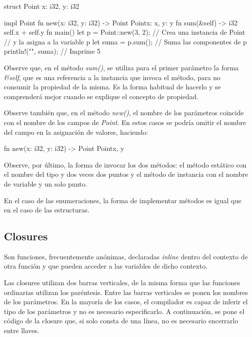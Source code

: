 \vspace{0.7em}
\begin{Codigo}
struct Point {
   x: i32,
   y: i32
}

impl Point {
   fn new(x: i32, y: i32) -> Point {
      Point{x: x, y: y}
   }
   fn sum(&self) -> i32 {
      self.x + self.y
   }
}
fn main() {
   let p = Point::new(3, 2); // Crea una instancia de Point 
                             // y la asigna a la variable p
   let suma = p.sum();       // Suma las componentes de p
   println!("{}", suma);     // Imprime 5
}
\end{Codigo}

Observe que, en el método \textit{sum()}, se utiliza para el primer parámetro la forma \textit{\&self}, que es una referencia a la instancia que invoca el método, para no consumir la propiedad de la misma. Es la forma habitual de hacerlo y se comprenderá mejor cuando se explique el concepto de propiedad.

Observe también que, en el método \textit{new()}, el nombre de los parámetros coincide con el nombre de los campos de \textit{Point}. En estos casos se podría omitir el nombre del campo en la asignación de valores, haciendo:

\vspace{0.7em}
\begin{Codigo}
fn new(x: i32, y: i32) -> Point {
   Point{x, y}
}
\end{Codigo}

Observe, por último, la forma de invocar los dos métodos: el método estático con el nombre del tipo y dos veces dos puntos y el método de instancia con el nombre de variable y un solo punto.

En el caso de las enumeraciones, la forma de implementar métodos es igual que en el caso de las estructuras.

\subsection{Closures}
\noindent Son funciones, frecuentemente anónimas, declaradas \textit{inline} dentro del contexto de otra función y que pueden acceder a las variables de dicho contexto.

Las closures utilizan dos barras verticales, de la misma forma que las funciones ordinarias utilizan los paréntesis. Entre las barras verticales se ponen los nombres de los parámetros. En la mayoría de los casos, el compilador es capaz de inferir el tipo de los parámetros y no es necesario especificarlo. A continuación, se pone el código de la closure que, si solo consta de una línea, no es necesario encerrarlo entre llaves.

